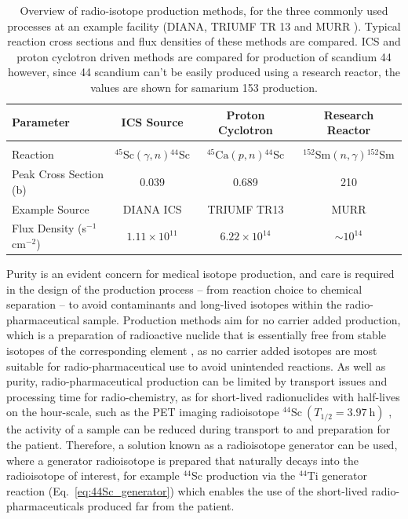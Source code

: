 \documentclass[../main.tex]{subfiles}
\begin{document}
\begin{table}[!h]
\centering
\caption{Overview of radio-isotope production methods, for the three commonly used processes at an example facility (DIANA, TRIUMF TR 13 and MURR ). Typical reaction cross sections and flux densities of these methods are compared. ICS and proton cyclotron driven methods are compared for production of scandium 44 however, since 44 scandium can't be easily produced using a research reactor, the values are shown for samarium 153 production.}
\vspace{3mm}
\begin{tabular}{lccc}
\hline\hline
Parameter & ICS Source & Proton Cyclotron & Research Reactor \\
\hline
\multicolumn{4}{c}{\vspace{-4mm}}\\
Reaction & $^{45}\mathrm{Sc}\left(\gamma,n\right){}^{44}\mathrm{Sc}$ & $^{45}\mathrm{Ca}\left(p,n\right){}^{44}\mathrm{Sc}$ & $^{152}\mathrm{Sm}\left(n,\gamma\right){}^{152}\mathrm{Sm}$ \\
Peak Cross Section (\si{\barn}) & 0.039 \cite{veyssiere1974study} & 0.689 \cite{carzaniga2017measurement} & 210 \cite{ma1996production} \\
Example Source & DIANA ICS & TRIUMF TR13 \cite{hoehr2017medical,laxdale1994beam} & MURR \cite{ma1996production} \\
Flux Density (\si{\second}$^{-1}$\si{\centi\meter}$^{-2}$) & $1.11\times 10^{11}$ & $6.22\times 10^{14}$ & $\sim 10^{14}$ \\
\hline\hline
\end{tabular}
\label{tab:example_isotope_cross_section_flux_density}
\end{table}


Purity is an evident concern for medical isotope production, and care is required in the design of the production process -- from reaction choice to chemical separation -- to avoid contaminants and long-lived isotopes within the radio-pharmaceutical sample. Production methods aim for no carrier added production, which is a preparation of radioactive nuclide that is essentially free from stable isotopes of the corresponding element \cite{currie1994nomenclature,wolf1981synthesis,coenen2017consensus}, as no carrier added isotopes are most suitable for radio-pharmaceutical use to avoid unintended reactions. As well as purity, radio-pharmaceutical production can be limited by transport issues and processing time for radio-chemistry, as for short-lived radionuclides with half-lives on the hour-scale, such as the PET imaging radioisotope $^{44}\mathrm{Sc}~\left(T_{1/2}=3.97~\si{\hour}\right)$ \cite{roesch2012scandium,muller2014promising}, the activity of a sample can be reduced during transport to and preparation for the patient. Therefore, a solution known as a radioisotope generator can be used, where a generator radioisotope is prepared that naturally decays into the radioisotope of interest, for example $^{44}\mathrm{Sc}$ production via the $^{44}\mathrm{Ti}$ generator reaction (Eq.~\ref{eq:44Sc_generator}) \cite{roesch2012scandium,muller2014promising} which enables the use of the short-lived radio-pharmaceuticals produced far from the patient.
\end{document}
